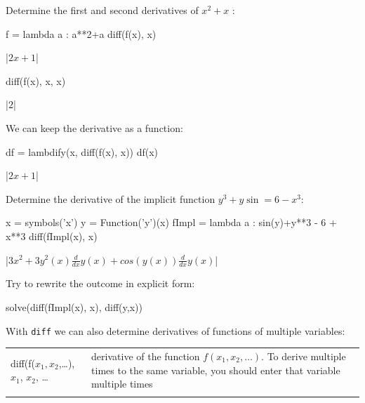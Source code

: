 \begin{example}
Determine the first and second derivatives of $x^2+x$ :
	
\begin{pyin}
    f = lambda a : a**2+a
    diff(f(x), x)
\end{pyin}
\begin{pyout}
    |$2x+1$|
\end{pyout}
\begin{pyin}
    diff(f(x), x, x)
\end{pyin}
\begin{pyout}
    |$2$|
\end{pyout}

	We can keep the derivative as a function:

\begin{pyin}
    df = lambdify(x, diff(f(x), x))
    df(x)
\end{pyin}
\begin{pyout}
    |$2x+1$|
\end{pyout}

	Determine the derivative of the implicit function $y^3+y \sin =6-x^3$: 

\begin{pyin}
    x = symbols('x')
    y = Function('y')(x)
    fImpl = lambda a : sin(y)+y**3 - 6 + x**3
    diff(fImpl(x), x)
\end{pyin}
\begin{pyout}
    |$3x^2+3y^2(x)\frac{d}{dx}y(x)+cos(y(x))\frac{d}{dx}y(x)$|
\end{pyout}

	Try to rewrite the outcome in explicit form: 

\begin{pyin}
    solve(diff(fImpl(x), x), diff(y,x))
\end{pyin}
\begin{pyout}
    [-3*x**2/(3*y(x)**2 + cos(y(x)))]
\end{pyout}
\end{example}

With \lstinline{diff} we can also determine derivatives of functions of multiple variables:

\begin{tabular}{>{\hfill}p{8cm}p{9cm}}
	diff(f($x_1,x_2$,\ldots), $x_1$, $x_2$, \ldots			&			derivative of the function $f(x_1,x_2,\ldots)$. To derive multiple times to the same variable, you should enter that variable multiple times\\
	\multicolumn{2}{l}{} 
\end{tabular}

